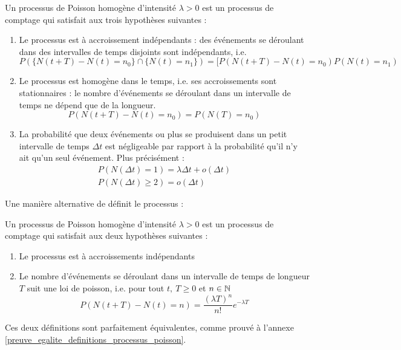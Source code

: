 \documentclass[11pt,a4paper]{article}
\numberwithin{equation}{section}
\begin{document}
 Un processus de Poisson homogène d'intensité $\lambda > 0$ est un processus de comptage qui satisfait aux trois hypothèses suivantes :
\begin{enumerate}[label=H\arabic*.]
    \item Le processus est à accroissement indépendants : des événements se déroulant dans des intervalles de temps disjoints sont indépendants, i.e.
    \[P(\{N(t+T) - N(t) = n_0\} \cap \{N(t) = n_1\}) = [P(N(t+T) - N(t) = n_0)P(N(t) = n_1)\]
    \item Le processus est homogène dans le temps, i.e. ses accroissements sont stationnaires : le nombre d'événements se déroulant dans un intervalle de temps ne dépend que de la longueur.
    \[P(N(t+T) - N(t) = n_0) = P(N(T) = n_0)\]
    \item La probabilité que deux événements ou plus se produisent dans un petit intervalle de temps $\Delta t$ est négligeable par rapport à la probabilité qu'il n'y ait qu'un seul événement. Plus précisément : 
    \begin{align*}
        P(N(\Delta t) = 1) = \lambda\Delta t + o(\Delta t)\\
        P(N(\Delta t) \geq 2) = o(\Delta t)
    \end{align*}
\end{enumerate}

Une manière alternative de définit le processus : 

 Un processus de Poisson homogène d'intensité $\lambda > 0$ est un processus de comptage qui satisfait aux deux hypothèses suivantes :
\begin{enumerate}
    \item Le processus est à accroissements indépendants
    \item Le nombre d'événements se déroulant dans un intervalle de temps de longueur $T$ suit une loi de poisson, i.e. pour tout $t,\ T \geq 0$ et $n \in \mathbb{N}$ 
    \[P(N(t+T) - N(t) = n) = \frac{(\lambda T)^n}{n!}    e^{-\lambda T}\]
\end{enumerate}

Ces deux définitions sont parfaitement équivalentes, comme prouvé à l'annexe \ref{preuve_egalite_definitions_processus_poisson}.
\end{document}
